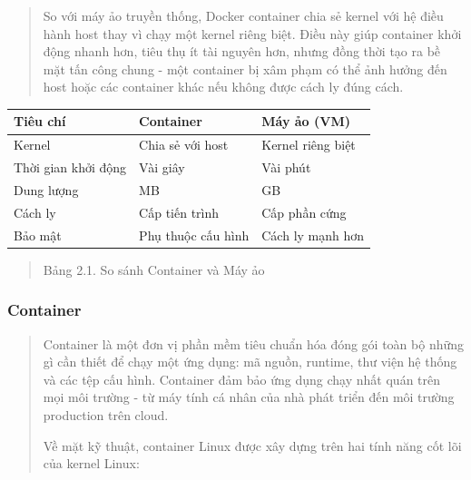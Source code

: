 \begin{quote}
So với máy ảo truyền thống, Docker container chia sẻ kernel với hệ điều hành host thay vì chạy một kernel riêng biệt. Điều này giúp container khởi động nhanh hơn, tiêu thụ ít tài nguyên hơn, nhưng đồng thời tạo ra bề mặt tấn công chung - một container bị xâm phạm có thể ảnh hưởng đến host hoặc các container khác nếu không được cách ly đúng cách.
\end{quote}

{\def\LTcaptype{none} %
\begin{longtable}[]{@{}
  >{\raggedright\arraybackslash}p{}
  >{\centering\arraybackslash}p{}
  >{\centering\arraybackslash}p{}@{}}
\toprule\noalign{}
\begin{minipage}[b]{\linewidth}\raggedright
\protect{}\label{_bookmark14}{}\textbf{Tiêu chí}
\end{minipage} & \begin{minipage}[b]{\linewidth}\centering
\textbf{Container}
\end{minipage} & \begin{minipage}[b]{\linewidth}\centering
\textbf{Máy ảo (VM)}
\end{minipage} \\
\midrule\noalign{}
\endhead
\bottomrule\noalign{}
\endlastfoot
Kernel & Chia sẻ với host & Kernel riêng biệt \\
Thời gian khởi động & Vài giây & Vài phút \\
Dung lượng & MB & GB \\
Cách ly & Cấp tiến trình & Cấp phần cứng \\
Bảo mật & Phụ thuộc cấu hình & Cách ly mạnh hơn \\
\end{longtable}
}

\begin{quote}
Bảng 2.1. So sánh Container và Máy ảo
\end{quote}

\subsubsection{Container}\label{container}

\begin{quote}
Container là một đơn vị phần mềm tiêu chuẩn hóa đóng gói toàn bộ những gì cần thiết để chạy một ứng dụng: mã nguồn, runtime, thư viện hệ thống và các tệp cấu hình. Container đảm bảo ứng dụng chạy nhất quán trên mọi môi trường - từ máy tính cá nhân của nhà phát triển đến môi trường production trên cloud.

Về mặt kỹ thuật, container Linux được xây dựng trên hai tính năng cốt lõi của kernel Linux:
\end{quote}

